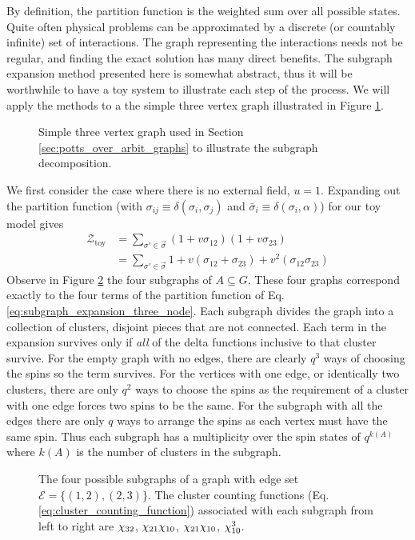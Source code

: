 By definition, the partition function is the weighted sum over all possible states. Quite often physical problems can be approximated by a discrete (or countably infinite) set of interactions. The graph representing the interactions needs not be regular, and finding the exact solution has many direct benefits. The subgraph expansion method presented here is somewhat abstract, thus it will be worthwhile to have a toy system to illustrate each step of the process. We will apply the methods to a the simple three vertex graph illustrated in Figure \ref{fig:three_node}.
\begin{figure}[ht]
\TIKZgraphABC
\caption{Simple three vertex graph used in Section \ref{sec:potts_over_arbit_graphs} to illustrate the subgraph decomposition.
}
\label{fig:three_node}
\end{figure}

We first consider the case where there is no external field, $u=1$. Expanding out the partition function (with $\sigma_{ij} \equiv \delta(\sigma_i, \sigma_j)$ and $\bar \sigma_{i} \equiv \delta(\sigma_i, \alpha)$) for our toy model gives
%
{ \allowdisplaybreaks
\begin{align}
\mathcal{Z}_\text{toy} &= 
     \sum_{\sigma ' \in \vec \sigma} (1 + v \sigma_{12})(1 + v \sigma_{23})  
\\ %
     &= \sum_{\sigma ' \in \vec \sigma} 1 
         + v(\sigma_{12} + \sigma_{23}) + v^2 (\sigma_{12} \sigma_{23})
\label{eq:subgraph_expansion_three_node}
\end{align}
}
%
Observe in Figure \ref{fig:three_node_subgraphs} the four subgraphs of $A \subseteq G$. These four graphs correspond exactly to the four terms of the partition function of Eq. 
\ref{eq:subgraph_expansion_three_node}. Each subgraph divides the graph into a collection of clusters, disjoint pieces that are not connected. Each term in the expansion survives only if \textit{all} of the delta functions inclusive to that cluster survive. For the empty graph with no edges, there are clearly $q^3$ ways of choosing the spins so the term survives. For the vertices with one edge, or identically two clusters, there are only $q^2$ ways to choose the spins as the requirement of a cluster with one edge forces two spins to be the same. For the subgraph with all the edges there are only $q$ ways to arrange the spins as each vertex must have the same spin. Thus each subgraph has a multiplicity over the spin states of $q^{k(A)}$ where $k(A)$ is the number of clusters in the subgraph. 

\begin{figure}[tb]
	\TIKZgraphABC 	\hspace{1em}
	\TIKZgraphAB	\hspace{1em}
	\TIKZgraphBC	\hspace{1em}
	\TIKZgraphC		\hspace{1em}
	\caption{
	The four possible subgraphs of a graph with edge set $\mathcal{E}=\{(1,2),(2,3)\}$. The cluster counting functions (Eq. \ref{eq:cluster_counting_function}) associated with each subgraph from left to right are $\chi_{3 2}$, $\chi_{2 1}\chi_{1 0}$, $\chi_{2 1}\chi_{1 0}$, $\chi_{1 0}^3$.
	}
	\label{fig:three_node_subgraphs}
\end{figure}

